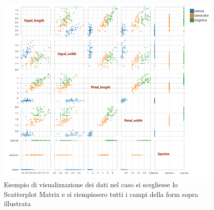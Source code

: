 \begin{figure}[H]
		\includegraphics[scale=0.4]{Images/ScatterplotMatrix.png}
		\centering
		\caption{Esempio di visualizzazione dei dati nel caso si scegliesse lo Scatterplot Matrix e si riempissero tutti i campi della form sopra illustrata}
\end{figure}

